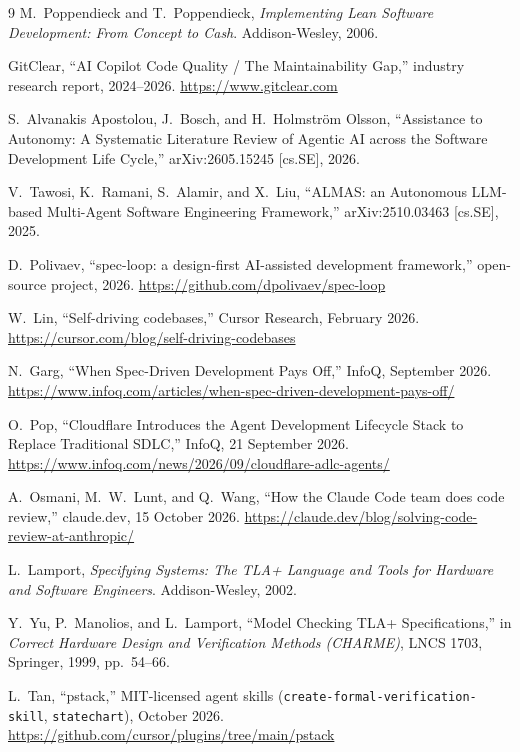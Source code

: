 \documentclass[11pt]{article}
\begin{document}
\begin{thebibliography}{9}
M.~Poppendieck and T.~Poppendieck, \emph{Implementing Lean Software
Development: From Concept to Cash}. Addison-Wesley, 2006.

GitClear, ``AI Copilot Code Quality / The Maintainability Gap,'' industry
research report, 2024--2026. \url{https://www.gitclear.com}

S.~Alvanakis Apostolou, J.~Bosch, and H.~Holmstr\"om Olsson,
``Assistance to Autonomy: A Systematic Literature Review of Agentic AI across
the Software Development Life Cycle,'' arXiv:2605.15245 [cs.SE], 2026.

V.~Tawosi, K.~Ramani, S.~Alamir, and X.~Liu,
``ALMAS: an Autonomous LLM-based Multi-Agent Software Engineering Framework,''
arXiv:2510.03463 [cs.SE], 2025.

D.~Polivaev, ``spec-loop: a design-first AI-assisted development framework,''
open-source project, 2026. \url{https://github.com/dpolivaev/spec-loop}

W.~Lin, ``Self-driving codebases,'' Cursor Research, February 2026.
\url{https://cursor.com/blog/self-driving-codebases}

N.~Garg, ``When Spec-Driven Development Pays Off,'' InfoQ, September 2026.
\url{https://www.infoq.com/articles/when-spec-driven-development-pays-off/}

O.~Pop, ``Cloudflare Introduces the Agent Development Lifecycle Stack to Replace
Traditional SDLC,'' InfoQ, 21 September 2026.
\url{https://www.infoq.com/news/2026/09/cloudflare-adlc-agents/}

A.~Osmani, M.~W.~Lunt, and Q.~Wang, ``How the Claude Code team does code
review,'' claude.dev, 15 October 2026.
\url{https://claude.dev/blog/solving-code-review-at-anthropic/}

L.~Lamport, \emph{Specifying Systems: The TLA+ Language and Tools for Hardware
and Software Engineers}. Addison-Wesley, 2002.

Y.~Yu, P.~Manolios, and L.~Lamport, ``Model Checking TLA+ Specifications,'' in
\emph{Correct Hardware Design and Verification Methods (CHARME)}, LNCS 1703,
Springer, 1999, pp.~54--66.

L.~Tan, ``pstack,'' MIT-licensed agent skills (\texttt{create-formal-verification-skill},
\texttt{statechart}), October 2026.
\url{https://github.com/cursor/plugins/tree/main/pstack}

\end{thebibliography}
\end{document}
